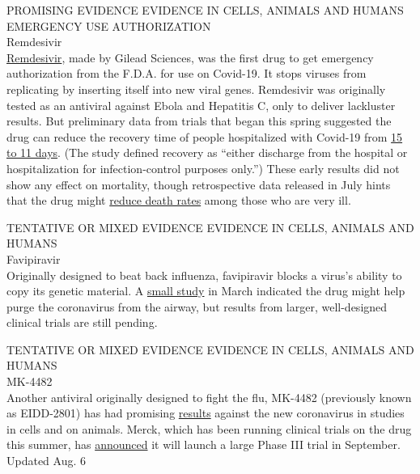 PROMISING EVIDENCE EVIDENCE IN CELLS, ANIMALS AND HUMANS EMERGENCY USE
AUTHORIZATION\\
Remdesivir\\
\href{https://www.nytimes3xbfgragh.onion/2020/05/23/health/coronavirus-remdesivir.html}{Remdesivir},
made by Gilead Sciences, was the first drug to get emergency
authorization from the F.D.A. for use on Covid-19. It stops viruses from
replicating by inserting itself into new viral genes. Remdesivir was
originally tested as an antiviral against Ebola and Hepatitis C, only to
deliver lackluster results. But preliminary data from trials that began
this spring suggested the drug can reduce the recovery time of people
hospitalized with Covid-19 from
\href{https://www.nejm.org/doi/full/10.1056/NEJMoa2007764}{15 to 11
days}. (The study defined recovery as ``either discharge from the
hospital or hospitalization for infection-control purposes only.'')
These early results did not show any effect on mortality, though
retrospective data released in July hints that the drug might
\href{https://www.gilead.com/news-and-press/press-room/press-releases/2020/7/gilead-presents-additional-data-on-investigational-antiviral-remdesivir-for-the-treatment-of-covid-19}{reduce
death rates} among those who are very ill.

TENTATIVE OR MIXED EVIDENCE EVIDENCE IN CELLS, ANIMALS AND HUMANS\\
Favipiravir\\
Originally designed to beat back influenza, favipiravir blocks a virus's
ability to copy its genetic material. A
\href{https://www.sciencedirect.com/science/article/pii/S2095809920300631?via\%3Dihub}{small
study} in March indicated the drug might help purge the coronavirus from
the airway, but results from larger, well-designed clinical trials are
still pending.

TENTATIVE OR MIXED EVIDENCE EVIDENCE IN CELLS, ANIMALS AND HUMANS\\
MK-4482\\
Another antiviral originally designed to fight the flu, MK-4482
(previously known as EIDD-2801) has had promising
\href{https://stm.sciencemag.org/content/12/541/eabb5883}{results}
against the new coronavirus in studies in cells and on animals. Merck,
which has been running clinical trials on the drug this summer, has
\href{https://www.cnbc.com/2020/07/31/merck-aims-to-start-large-pivotal-studies-on-coronavirus-treatment-in-september.html}{announced}
it will launch a large Phase III trial in September.\\
Updated Aug. 6


